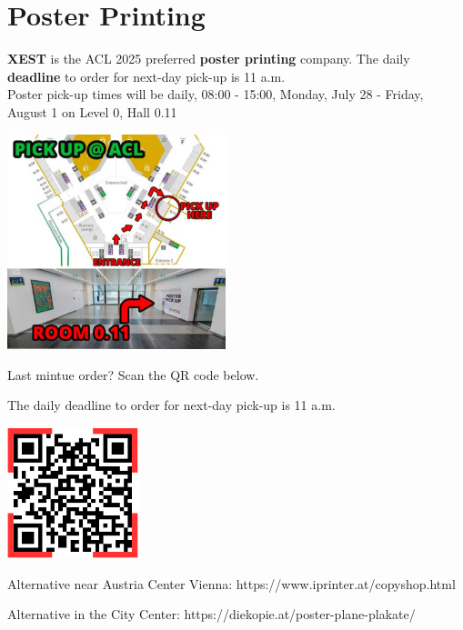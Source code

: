 \chapter{Poster Printing}

\textbf{XEST} is the ACL 2025 preferred \textbf{poster printing} company. The daily \textbf{deadline} to order for next-day pick-up is 11 a.m.\\
 
Poster pick-up times will be daily, 08:00 - 15:00, Monday, July 28 - Friday, August 1 on Level 0, Hall 0.11\\

\begin{center}
\includegraphics[width=2.5in]{examples/acl25-handbook/local_guide/PosterPickUpMap.png}
\end{center}

Last mintue order? Scan the QR code below.

The daily deadline to order for next-day pick-up is 11 a.m.

\includegraphics[width=1.5in]{examples/acl25-handbook/local_guide/PosterPrintingQRCode.png}

Alternative near Austria Center Vienna: https://www.iprinter.at/copyshop.html

Alternative in the City Center: https://diekopie.at/poster-plane-plakate/\\
